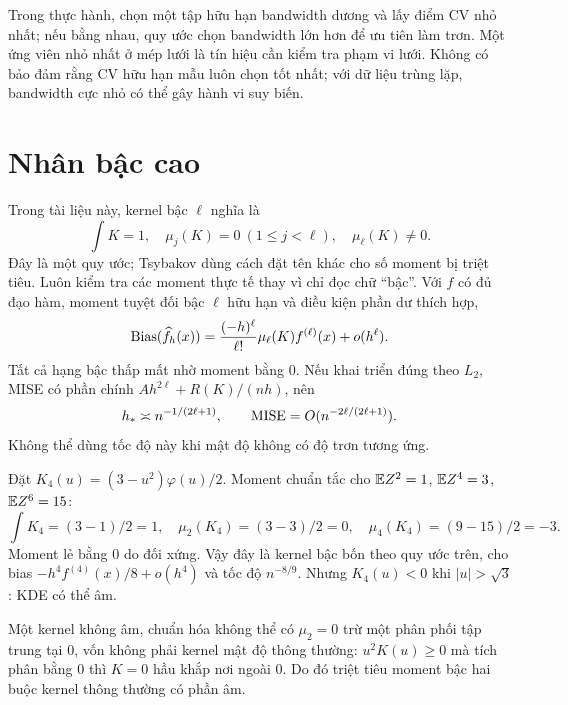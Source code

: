 Trong thực hành, chọn một tập hữu hạn bandwidth dương và lấy điểm CV nhỏ
nhất; nếu bằng nhau, quy ước chọn bandwidth lớn hơn để ưu tiên làm trơn.
Một ứng viên nhỏ nhất ở mép lưới là tín hiệu cần kiểm tra phạm vi lưới.
Không có bảo đảm rằng CV hữu hạn mẫu luôn chọn tốt nhất; với dữ liệu
trùng lặp, bandwidth cực nhỏ có thể gây hành vi suy biến.

\section{Nhân bậc cao}
Trong tài liệu này, kernel bậc $\ell$ nghĩa là
\[
\int K=1,\quad\mu_j(K)=0\ (1\leq j<\ell),\quad\mu_\ell(K)\ne0.
\]
Đây là một quy ước; Tsybakov dùng cách đặt tên khác cho số moment bị
triệt tiêu. Luôn kiểm tra các moment thực tế thay vì chỉ đọc chữ ``bậc''.
Với $f$ có đủ đạo hàm, moment tuyệt đối bậc $\ell$ hữu hạn và điều kiện
phần dư thích hợp,
\[
\operatorname{Bias}(\widehat f_h(x))=
\frac{(-h)^\ell}{\ell!}\mu_\ell(K)f^{(\ell)}(x)+o(h^\ell).
\]
Tất cả hạng bậc thấp mất nhờ moment bằng 0.
Nếu khai triển đúng theo $L_2$, MISE có phần chính
$Ah^{2\ell}+R(K)/(nh)$, nên
\[
h_*\asymp n^{-1/(2\ell+1)},\qquad
\operatorname{MISE}=O(n^{-2\ell/(2\ell+1)}).
\]
Không thể dùng tốc độ này khi mật độ không có độ trơn tương ứng.

\begin{example}
Đặt $K_4(u)=(3-u^2)\varphi(u)/2$.
Moment chuẩn tắc cho $\mathbb E Z^2=1$, $\mathbb E Z^4=3$, $\mathbb E Z^6=15$:
\[
\int K_4=(3-1)/2=1,\quad
\mu_2(K_4)=(3-3)/2=0,\quad
\mu_4(K_4)=(9-15)/2=-3.
\]
Moment lẻ bằng 0 do đối xứng. Vậy đây là kernel bậc bốn theo quy ước
trên, cho bias $-h^4f^{(4)}(x)/8+o(h^4)$ và tốc độ $n^{-8/9}$.
Nhưng $K_4(u)<0$ khi $|u|>\sqrt3$: KDE có thể âm.
\end{example}
Một kernel không âm, chuẩn hóa không thể có $\mu_2=0$ trừ một phân
phối tập trung tại 0, vốn không phải kernel mật độ thông thường:
$u^2K(u)\geq0$ mà tích phân bằng 0 thì $K=0$ hầu khắp nơi ngoài 0.
Do đó triệt tiêu moment bậc hai buộc kernel thông thường có phần âm.

